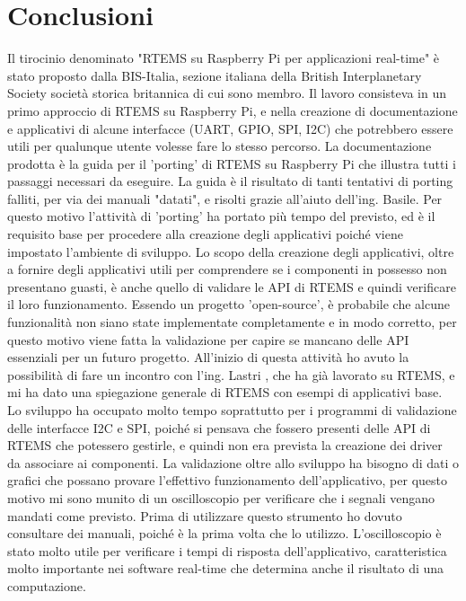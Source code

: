\documentclass[12pt, a4paper, titlepage, oneside]{book}
\begin{document}
\chapter{Conclusioni}
Il tirocinio denominato "RTEMS su Raspberry Pi per applicazioni real-time" è stato proposto dalla BIS-Italia, sezione italiana della British Interplanetary Society società storica britannica di cui sono membro. \newline 
Il lavoro consisteva in un primo approccio di RTEMS su Raspberry Pi, e nella creazione di documentazione e applicativi di alcune interfacce (UART, GPIO, SPI, I2C) che potrebbero essere utili per qualunque utente volesse fare lo stesso percorso.\newline
La documentazione prodotta è la guida per il 'porting' di RTEMS su Raspberry Pi che illustra tutti i passaggi necessari da eseguire.\newline
La guida è il risultato di tanti tentativi di porting falliti, per via dei manuali "datati", e risolti grazie all'aiuto dell'ing. Basile. Per questo motivo l'attività di 'porting' ha portato più tempo del previsto, ed è il requisito base per procedere alla creazione degli applicativi poiché viene impostato l'ambiente di sviluppo.\newline
Lo scopo della creazione degli applicativi, oltre a fornire degli applicativi utili per comprendere se i componenti in possesso non presentano guasti, è anche quello di validare le API di RTEMS e quindi verificare il loro funzionamento. Essendo un progetto 'open-source', è probabile che alcune funzionalità non siano state implementate completamente e in modo corretto, per questo motivo viene fatta la validazione per capire se mancano delle API essenziali per un futuro progetto. All'inizio di questa attività ho avuto la possibilità di fare un incontro con l'ing. Lastri , che ha già lavorato su RTEMS, e mi ha dato una spiegazione generale di RTEMS con esempi di applicativi base.\newline
Lo sviluppo ha occupato molto tempo soprattutto per i programmi di validazione delle interfacce I2C e SPI, poiché si pensava che fossero presenti delle API di RTEMS che potessero gestirle, e quindi non era prevista la creazione dei driver da associare ai componenti.\newline
La validazione oltre allo sviluppo ha bisogno di dati o grafici che possano provare l'effettivo funzionamento dell'applicativo, per questo motivo mi sono munito di un oscilloscopio per verificare che i segnali vengano mandati come previsto. Prima di utilizzare questo strumento ho dovuto consultare dei manuali, poiché è la prima volta che lo utilizzo. L'oscilloscopio è stato molto utile per verificare i tempi di risposta dell'applicativo, caratteristica molto importante nei software real-time che determina anche il risultato di una computazione.\newline
\end{document}
